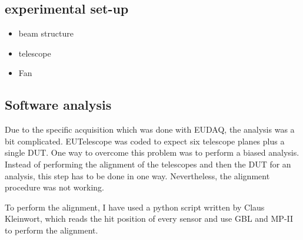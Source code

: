     \begin{figure}
    \end{figure}

    \subsection{experimental set-up}

    \begin{itemize}
      \item beam structure
      \item telescope
      \item Fan
    \end{itemize}
    \begin{figure}
    \end{figure}

    \subsection{Software analysis}

    Due to the specific acquisition which was done with EUDAQ, the analysis was a bit complicated.
    EUTelescope was coded to expect six telescope planes plus a single DUT.
    One way to overcome this problem was to perform a biased analysis.
    Instead of performing the alignment of the telescopes and then the DUT for an analysis, this step has to be done in one way.
    Nevertheless, the alignment procedure was not working.

    To perform the alignment, I have used a python script written by Claus Kleinwort, which reads the hit position of every sensor and use GBL and MP-II to perform the alignment.

